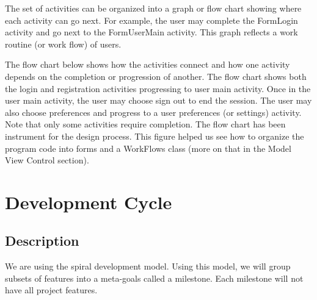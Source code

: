 \documentclass[a4paper,10pt,toc=graduated]{article}
\begin{document}
The set of activities can be organized into a graph or flow chart showing 
where each activity can go next.
For example, the user may complete the FormLogin activity
and go next to the FormUserMain activity.
This graph reflects a work routine (or work flow) of users.
\newline

The flow chart below shows how the activities connect
and how one activity depends on the completion or progression of another.
The flow chart shows both the login and registration activities progressing to user main activity.
Once in the user main activity, the user may choose sign out to end the session.
The user may also choose preferences and progress to a user preferences (or settings) activity.
\newline
{}
Note that only some activities require completion.
The flow chart has been instrument for the design process.
This figure helped us see how to organize the program code into forms
and a WorkFlows class (more on that in the Model View Control section).

\section{Development Cycle}
\subsection{Description}
We are using the spiral development model.
Using this model,
we will group subsets of features into a meta-goals called a milestone.
Each milestone will not have all project features.

\end{document}
